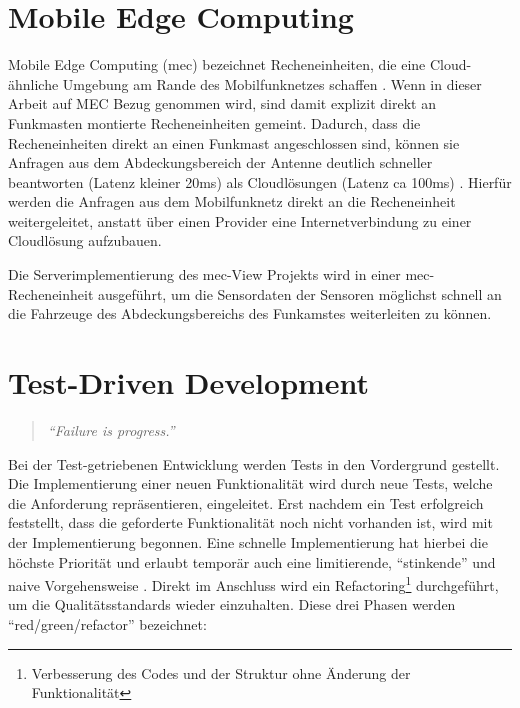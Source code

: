 \section{Mobile Edge Computing}

Mobile Edge Computing (\gls{mec}) bezeichnet Recheneinheiten, die eine Cloud-ähnliche Umgebung am Rande des Mobilfunknetzes schaffen \cite[4]{etsi:mec}.
Wenn in dieser Arbeit auf MEC Bezug genommen wird, sind damit explizit direkt an Funkmasten montierte Recheneinheiten gemeint.
Dadurch, dass die Recheneinheiten direkt an einen Funkmast angeschlossen sind, können sie Anfragen aus dem Abdeckungsbereich der Antenne deutlich schneller beantworten (Latenz kleiner 20ms) als Cloudlösungen (Latenz ca 100ms) \cite[2]{perf:mec:fraunhofer}.
Hierfür werden die Anfragen aus dem Mobilfunknetz direkt an die Recheneinheit weitergeleitet, anstatt über einen Provider eine Internetverbindung zu einer Cloudlösung aufzubauen.

Die Serverimplementierung des \gls{mec}-View Projekts wird in einer \gls{mec}-Recheneinheit ausgeführt, um die Sensordaten der Sensoren möglichst schnell an die Fahrzeuge des Abdeckungsbereichs des Funkamstes weiterleiten zu können.




	
\section{Test-Driven Development}
\label{tdd}

\begin{quotation}
	\textit{\enquote{Failure is progress.}}
	\cite[5]{tdd}
\end{quotation}

Bei der Test-getriebenen Entwicklung werden Tests in den Vordergrund gestellt.
Die Implementierung einer neuen Funktionalität wird durch neue Tests, welche die Anforderung repräsentieren, eingeleitet.
Erst nachdem ein Test erfolgreich feststellt, dass die geforderte Funktionalität noch nicht vorhanden ist, wird mit der Implementierung begonnen.
Eine schnelle Implementierung hat hierbei die höchste Priorität und erlaubt temporär auch eine limitierende, \enquote{stinkende} und naive Vorgehensweise \cite[7]{tdd}.
Direkt im Anschluss wird ein Refactoring\footnote{Verbesserung des Codes und der Struktur ohne Änderung der Funktionalität} durchgeführt, um die Qualitätsstandards wieder einzuhalten.
Diese drei Phasen werden \enquote{red/green/refactor} bezeichnet:


